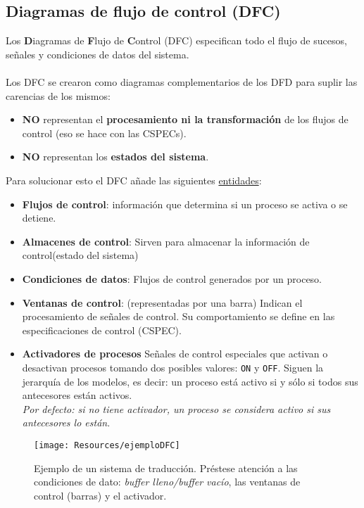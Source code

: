 \subsection{Diagramas de flujo de control (DFC)}
Los \textbf{D}iagramas de \textbf{F}lujo de \textbf{C}ontrol (DFC) especifican todo el flujo de sucesos, señales y condiciones de datos del sistema.
\\
\\
Los DFC se crearon como diagramas complementarios de los DFD para suplir las carencias de los mismos:
\begin{itemize}
    \item \textbf{NO} representan el \textbf{procesamiento ni la transformación} de los flujos de control (eso se hace con las CSPECs).
    \item \textbf{NO} representan los \textbf{estados del sistema}.
\end{itemize}
Para solucionar esto el DFC añade las siguientes \uline{entidades}:
\begin{itemize}
    \item \textbf{Flujos de control}: información que determina si un proceso se activa o se detiene.
    \item \textbf{Almacenes de control}: Sirven para almacenar la información de control(estado del sistema)
    \item \textbf{Condiciones de datos}: Flujos de control generados por un proceso.
    \item \textbf{Ventanas de control}: (representadas por una barra) Indican el procesamiento de señales de control. Su comportamiento se define en las especificaciones de control (CSPEC).
    \item \textbf{Activadores de procesos} Señales de control especiales que activan o desactivan procesos tomando dos posibles valores: \texttt{ON} y \texttt{OFF}. Siguen la jerarquía de los modelos, es decir: un proceso está activo si y sólo si todos sus antecesores están activos.
          \\
          \textit{Por defecto: si no tiene activador, un proceso se considera activo si sus antecesores lo están}.
\end{itemize}

\begin{figure}[H]
    \centering
    \texttt{[image: Resources/ejemploDFC]}
    \caption{Ejemplo de un sistema de traducción. Préstese atención a las condiciones de dato: \textit{buffer lleno/buffer vacío}, las ventanas de control (barras) y el activador.}
    \label{fig:ejemploCSPEC}
\end{figure}


